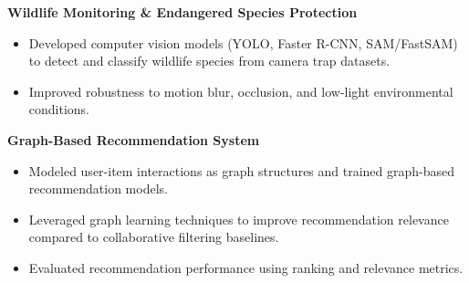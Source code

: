 \documentclass[a4paper,8pt]{extarticle}
\begin{document}
\noindent
\textbf{Wildlife Monitoring \& Endangered Species Protection}

\begin{itemize}
\item Developed computer vision models (YOLO, Faster R-CNN, SAM/FastSAM) to detect and classify wildlife species from camera trap datasets.
\item Improved robustness to motion blur, occlusion, and low-light environmental conditions.
\end{itemize}

\noindent
\textbf{Graph-Based Recommendation System}

\begin{itemize}
\item Modeled user-item interactions as graph structures and trained graph-based recommendation models.
\item Leveraged graph learning techniques to improve recommendation relevance compared to collaborative filtering baselines.
\item Evaluated recommendation performance using ranking and relevance metrics.
\end{itemize}
\end{document}

